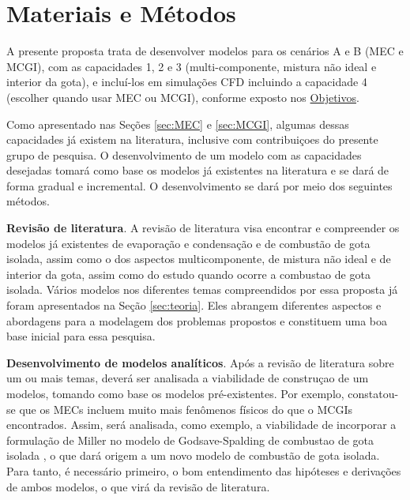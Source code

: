 

\section{Materiais e Métodos}

A presente proposta trata de desenvolver modelos para os cenários A e B (MEC e MCGI), com as capacidades 1, 2 e 3 (multi-componente, mistura não ideal e interior da gota), e incluí-los em simulações CFD incluindo a capacidade 4 (escolher quando usar MEC ou MCGI), conforme exposto nos \hyperref[sec:objetivos]{Objetivos}.

Como apresentado nas Seções \ref{sec:MEC} e \ref{sec:MCGI}, algumas dessas capacidades já existem na literatura, inclusive com contribuiçoes do presente grupo de pesquisa.
O desenvolvimento de um modelo com as capacidades desejadas tomará como base os modelos já existentes na literatura e se dará de forma gradual e incremental.
O desenvolvimento se dará por meio dos seguintes métodos.

\textbf{Revisão de literatura}. 
A revisão de literatura visa encontrar e compreender os modelos já  existentes de evaporação e condensação e de combustão de gota isolada, assim como o dos aspectos multicomponente, de mistura não ideal e de interior da gota, assim como do estudo quando ocorre a combustao de gota isolada.
Vários modelos nos diferentes temas compreendidos por essa proposta já foram apresentados na Seção \ref{sec:teoria}.
Eles abrangem diferentes aspectos e abordagens para a modelagem dos problemas propostos e constituem uma boa base inicial para essa pesquisa. 

\textbf{Desenvolvimento de modelos analíticos}.
Após a revisão de literatura sobre um ou mais temas, deverá ser analisada a viabilidade de construçao de um modelos, tomando como base os modelos pré-existentes.
Por exemplo, constatou-se que os MECs incluem muito mais fenômenos físicos do que o MCGIs encontrados. 
Assim, será analisada, como exemplo, a viabilidade de incorporar a formulação de Miller \cite{MillerR1998} no modelo de Godsave-Spalding de combustao de gota isolada \cite{Law1978}, o que dará origem a um novo modelo de combustão de gota isolada.
Para tanto, é necessário primeiro, o bom entendimento das hipóteses e derivações de ambos modelos, o que virá da revisão de literatura.   


